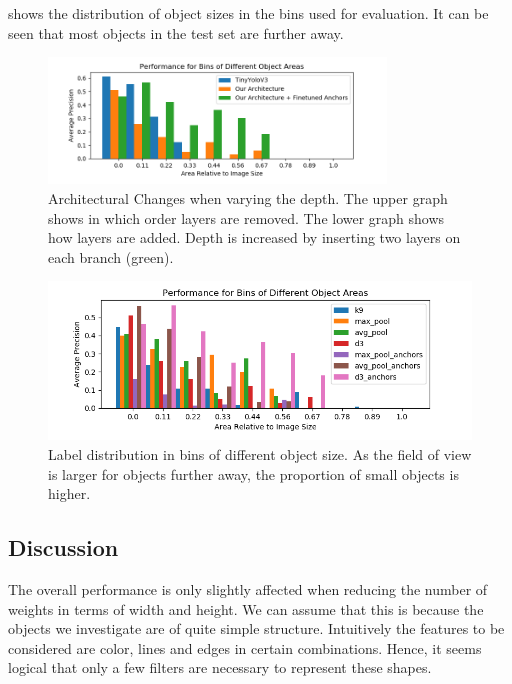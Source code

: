	 shows the distribution of object sizes in the bins used for evaluation. It can be seen that most objects in the test set are further away. 
	
	\begin{figure}[hbtp]
		\centering
		\includegraphics[width=0.8\textwidth]{fig/hyperparam_size}
		\caption{Architectural Changes when varying the depth. The upper graph shows in which order layers are removed. The lower graph shows how layers are added. Depth is increased by inserting two layers on each branch (green). }
		\label{fig:hyp}
	\end{figure}
	
	\begin{figure}[hbtp]
		\centering
		\includegraphics[width=\textwidth]{fig/rf_ap_size}
		\caption{Label distribution in bins of different object size. As the field of view is larger for objects further away, the proportion of small objects is higher.}
		\label{fig:size_bins}
	\end{figure}
	
	\subsection{Discussion}
	
	The overall performance is only slightly affected when reducing the number of weights in terms of width and height. We can assume that this is because the objects we investigate are of quite simple structure. Intuitively the features to be considered are color, lines and edges in certain combinations. Hence, it seems logical that only a few filters are necessary to represent these shapes.
	

